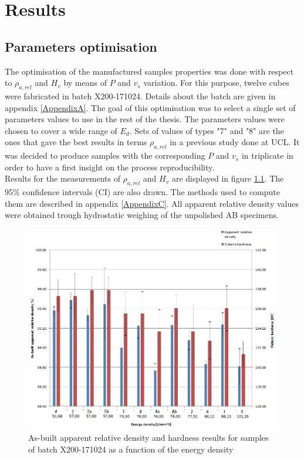 \chapter{Results}
\label{Chap4}
\section{Parameters optimisation}
\label{Rparaopti}
The optimisation of the manufactured samples properties was done with respect to $\rho_{a,rel}$ and $H_v$  by means of $P$ and $v_s$ variation. For this purpose, twelve cubes were fabricated in batch X200-171024. Details about the batch are given in appendix \ref{AppendixA}. The goal of this optimisation was to select a single set of parameters values to use in the rest of the thesis. The parameters values were chosen to cover a wide range of $E_d$. Sets of values of types "7" and "8" are the ones that gave the best results in terms $\rho_{a,rel}$ in a previous study done at UCL. It was decided to produce samples with the corresponding $P$ and $v_s$ in triplicate in order to have a first insight on the process reproducibility.\\

Results for the measurements of $\rho_{a,rel}$ and $H_v$ are displayed in figure \ref{fig:HD-171024}. The 95\% confidence intervals (CI) are also drawn. The methods used to compute them are described in appendix \ref{AppendixC}. All apparent relative density values were obtained trough hydrostatic weighing of the unpolished AB specimens.\\

\begin{figure}[ht]
\centering
\centerline{\includegraphics[scale=0.62]{Images/HD-171024}}
\decoRule
\caption[As-built apparent relative density and hardness results for samples of batch X200-171024 as a function of the energy density]{As-built apparent relative density and hardness results for samples of batch X200-171024 as a function of the energy density}
\label{fig:HD-171024}
\end{figure} 

